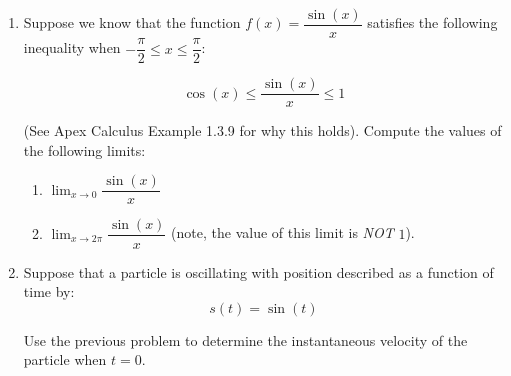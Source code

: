 \documentclass[12pt]{exam}
\begin{document}
\begin{enumerate}
\begin{enumerate}
\vfill

\item[(b)] $\displaystyle\lim_{x\to \pi}\frac{1-\cos(x)}{x^2}$

\vfill

\item[(c)] $\displaystyle \lim_{x \to \infty} \frac{1 - \cos(x)}{x^2}$

\vfill

\end{enumerate}

\newpage
\item[4.]

  Suppose we know that the function $f(x) = \dfrac{\sin(x)}{x}$
  satisfies the following inequality when $-\dfrac{\pi}{2} \leq x \leq \dfrac{\pi}{2}$:

  \begin{equation*}
    \cos(x) \leq \dfrac{\sin(x)}{x} \leq 1
  \end{equation*}

  (See Apex Calculus Example 1.3.9 for why this holds). Compute the values of the following limits:

  \begin{enumerate}
    \item[(a)] $\displaystyle \lim_{x\rightarrow 0} \dfrac{\sin(x)}{x}$
      \vfill

    \item[(b)] $\displaystyle \lim_{x \rightarrow 2\pi} \dfrac{\sin(x)}{x}$ (note, the value of this limit is \textit{NOT} $1$).
      \vfill
  \end{enumerate}

\item[5.] Suppose that a particle is oscillating with position described as a function of time by:
  \begin{equation*}
    s(t) = \sin(t)
  \end{equation*}

  Use the previous problem to determine the instantaneous velocity of the particle when $t = 0$.
  \vfill
\end{enumerate}









\end{document}
